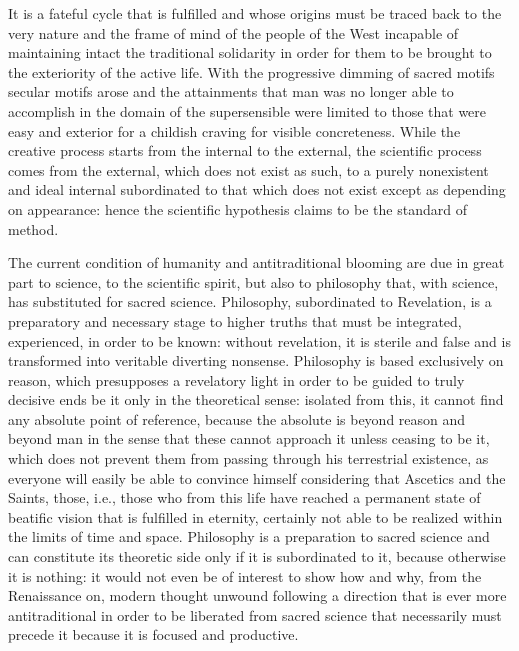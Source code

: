 It is a fateful cycle that is fulfilled and whose origins must be traced back to the very nature and the frame of mind of the people of the West incapable of maintaining intact the traditional solidarity in order for them to be brought to the exteriority of the active life. With the progressive dimming of sacred motifs secular motifs arose and the attainments that man was no longer able to accomplish in the domain of the supersensible were limited to those that were easy and exterior for a childish craving for visible concreteness. While the creative process starts from the internal to the external, the scientific process comes from the external, which does not exist as such, to a purely nonexistent and ideal internal subordinated to that which does not exist except as depending on appearance: hence the scientific hypothesis claims to be the standard of method.

The current condition of humanity and antitraditional blooming are due in great part to science, to the scientific spirit, but also to philosophy that, with science, has substituted for sacred science. Philosophy, subordinated to Revelation, is a preparatory and necessary stage to higher truths that must be integrated, experienced, in order to be known: without revelation, it is sterile and false and is transformed into veritable diverting nonsense. Philosophy is based exclusively on reason, which presupposes a revelatory light in order to be guided to truly decisive ends be it only in the theoretical sense: isolated from this, it cannot find any absolute point of reference, because the absolute is beyond reason and beyond man in the sense that these cannot approach it unless ceasing to be it, which does not prevent them from passing through his terrestrial existence, as everyone will easily be able to convince himself considering that Ascetics and the Saints, those, i.e., those who from this life have reached a permanent state of beatific vision that is fulfilled in eternity, certainly not able to be realized within the limits of time and space. Philosophy is a preparation to sacred science and can constitute its theoretic side only if it is subordinated to it, because otherwise it is nothing: it would not even be of interest to show how and why, from the Renaissance on, modern thought unwound following a direction that is ever more antitraditional in order to be liberated from sacred science that necessarily must precede it because it is focused and productive.

